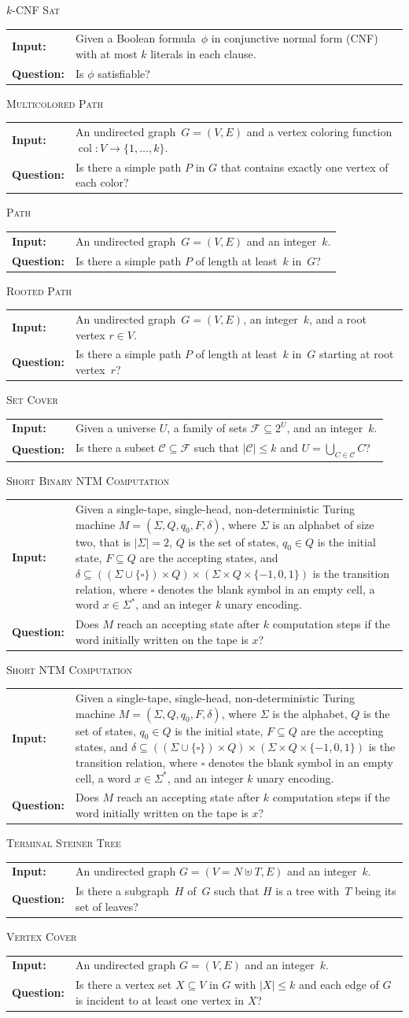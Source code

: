 \documentclass[11pt,a4,USenglish]{article}
\makeatletter
\newcommand{\prob}[1]{\textsc{#1}}
\DeclareMathOperator{\col}{col}
\theoremstyle{definition}
\theoremstyle{plain}
\theoremstyle{remark}
\newcommand{\decprob}[3]{
  \begin{center}
    \begin{minipage}{0.95\textwidth}
      \noindent
      \prob{#1}\vspace{2pt}\\
      \setlength{\tabcolsep}{3pt}
      \begin{tabularx}{\textwidth}{@{}lX@{}}
	\normalsize \textbf{Input:} 		& \normalsize #2 \\
	\normalsize \textbf{Question:} 	& \normalsize #3
      \end{tabularx}
    \end{minipage}
  \end{center}
}
\makeatother
\begin{document}
\decprob{$k$-CNF Sat}
{Given a Boolean formula~$\phi$ in conjunctive normal form (CNF) with at most $k$ literals in each clause.}
{Is $\phi$ satisfiable?}

\decprob{Multicolored Path}
{An undirected graph~$G=(V,E)$ and a vertex coloring function $\col:V \to \{1,\ldots,k\}$.}
{Is there a simple path $P$ in $G$ that contains exactly one vertex of each color?}

\decprob{Path}
{An undirected graph~$G=(V,E)$ and an integer~$k$.}
{Is there a simple path $P$ of length at least~$k$ in~$G$?}

\decprob{Rooted Path}
{An undirected graph~$G=(V,E)$, an integer~$k$, and a root vertex $r\in V$.}
{Is there a simple path $P$ of length at least~$k$ in~$G$ starting at root vertex~$r$?}

\decprob{Set Cover}
{Given a universe $U$, a family of sets $\mathcal{F}\subseteq 2^U$, and an integer~$k$.}
{Is there a subset $\mathcal{C}\subseteq \mathcal{F}$ such that $|\mathcal{C}|\leq k$ and $U=\bigcup_{C\in \mathcal{C}} C$?}

\decprob{Short Binary NTM Computation}
{Given a single-tape, single-head, non-deterministic Turing machine $M=(\Sigma, Q, q_0, F, \delta)$, where $\Sigma$ is an alphabet of size two, that is $|\Sigma| = 2$, $Q$ is the set of states, $q_0\in Q$ is the initial state, $F\subseteq Q$ are the accepting states, and $\delta \subseteq ((\Sigma\cup\{\square\}) \times Q)\times (\Sigma\times Q\times \{-1, 0, 1\})$ is the transition relation, where $\square$ denotes the blank symbol in an empty cell, a word $x\in\Sigma^*$, and an integer $k$ unary encoding.}
{Does $M$ reach an accepting state after $k$ computation steps if the word initially written on the tape is $x$?}

\decprob{Short NTM Computation}
{Given a single-tape, single-head, non-deterministic Turing machine $M=(\Sigma, Q, q_0, F, \delta)$, where $\Sigma$ is the alphabet, $Q$ is the set of states, $q_0\in Q$ is the initial state, $F\subseteq Q$ are the accepting states, and $\delta \subseteq ((\Sigma\cup\{\square\}) \times Q)\times (\Sigma\times Q\times \{-1, 0, 1\})$ is the transition relation, where $\square$ denotes the blank symbol in an empty cell, a word $x\in\Sigma^*$, and an integer $k$ unary encoding.}
{Does $M$ reach an accepting state after $k$ computation steps if the word initially written on the tape is $x$?}

\decprob{Terminal Steiner Tree}
{An undirected graph $G=(V=N\uplus T,E)$ and an integer~$k$.}
{Is there a subgraph~$H$ of~$G$ such that $H$ is a tree with~$T$ being its set of leaves?}

\decprob{Vertex Cover}
{An undirected graph $G=(V,E)$ and an integer~$k$.}
{Is there a vertex set $X\subseteq V$ in $G$ with $|X|\le k$ and each edge of $G$ is incident to at least one vertex in $X$?}
\end{document}
